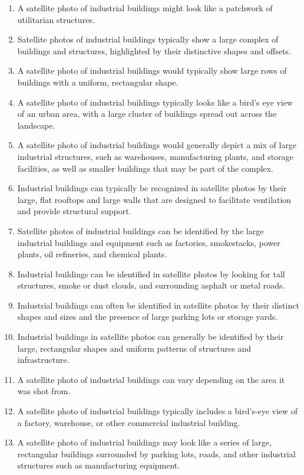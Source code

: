 \documentclass[11pt]{article}
\begin{document}
\begin{enumerate}
\item A satellite photo of industrial buildings might look like a patchwork of utilitarian structures.
\item Satellite photos of industrial buildings typically show a large complex of buildings and structures, highlighted by their distinctive shapes and offsets.
\item A satellite photo of industrial buildings would typically show large rows of buildings with a uniform, rectangular shape.
\item A satellite photo of industrial buildings typically looks like a bird's eye view of an urban area, with a large cluster of buildings spread out across the landscape.
\item A satellite photo of industrial buildings would generally depict a mix of large industrial structures, such as warehouses, manufacturing plants, and storage facilities, as well as smaller buildings that may be part of the complex.
\item Industrial buildings can typically be recognized in satellite photos by their large, flat rooftops and large walls that are designed to facilitate ventilation and provide structural support.
\item Satellite photos of industrial buildings can be identified by the large industrial buildings and equipment such as factories, smokestacks, power plants, oil refineries, and chemical plants.
\item Industrial buildings can be identified in satellite photos by looking for tall structures, smoke or dust clouds, and surrounding asphalt or metal roads.
\item Industrial buildings can often be identified in satellite photos by their distinct shapes and sizes and the presence of large parking lots or storage yards.
\item Industrial buildings in satellite photos can generally be identified by their large, rectangular shapes and uniform patterns of structures and infrastructure.
\item A satellite photo of industrial buildings can vary depending on the area it was shot from.
\item A satellite photo of industrial buildings typically includes a bird's-eye view of a factory, warehouse, or other commercial industrial building.
\item A satellite photo of industrial buildings may look like a series of large, rectangular buildings surrounded by parking lots, roads, and other industrial structures such as manufacturing equipment.

\end{enumerate}
\end{document}
